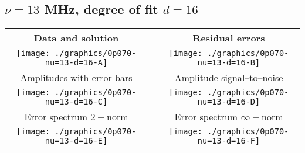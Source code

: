 

% 

\clearpage{}
\break{}

\subsection{$\nu = 13$ MHz, degree of fit $d = 16$}

\begin{table}[h]
    \begin{center}
        \begin{tabular}{ccc}
            Data and solution & \quad & Residual errors \\\hline
            \texttt{[image: ./graphics/0p070-nu=13-d=16-A]} &&
            \texttt{[image: ./graphics/0p070-nu=13-d=16-B]} \\[15pt]
            Amplitudes with error bars && Amplitude signal--to--noise \\\hline
            \texttt{[image: ./graphics/0p070-nu=13-d=16-C]} &&
            \texttt{[image: ./graphics/0p070-nu=13-d=16-D]} \\[15pt]
            Error spectrum $2-$norm && Error spectrum $\infty-$norm \\\hline
            \texttt{[image: ./graphics/0p070-nu=13-d=16-E]} &&
            \texttt{[image: ./graphics/0p070-nu=13-d=16-F]} \\[15pt]
        \end{tabular}
    \end{center}
\label{fig:elev=70, nu=13}
\end{table}



\endinput
